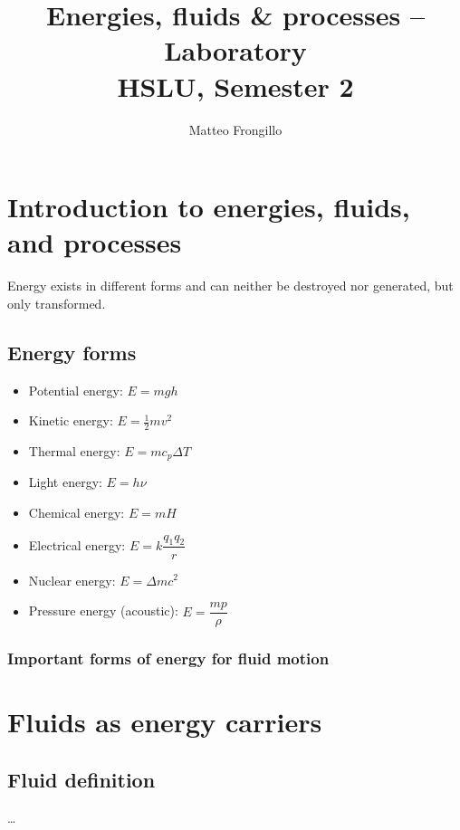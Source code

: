 \documentclass{article}
\title{\textbf{Energies, fluids \& processes -- Laboratory \\ HSLU, Semester 2}}
\author{Matteo Frongillo}
\date{}
\begin{document}
\maketitle
\tableofcontents
\pagebreak

\section{Introduction to energies, fluids, and processes}
Energy exists in different forms and can neither be destroyed nor generated, but only
transformed.

\subsection{Energy forms}
\begin{minipage}{.45\textwidth}
    \begin{itemize}[itemsep=6pt]
        \item Potential energy: $E = mgh$
        \item Kinetic energy: $E = \frac{1}{2}mv^2$
        \item Thermal energy: $E = mc_p\Delta T$
        \item Light energy: $E = h\nu$
    \end{itemize}
\end{minipage}
\hfill
\begin{minipage}{.45\textwidth}
    \begin{itemize}[itemsep=6pt]
        \item Chemical energy: $E = mH$
        \item Electrical energy: $E = k\dfrac{q_1 q_2}{r}$
        \item Nuclear energy: $E = \Delta mc^2$
        \item Pressure energy (acoustic): $E = \dfrac{m p}{\rho}$
    \end{itemize}
\end{minipage}

\subsubsection{Important forms of energy for fluid motion}

\section{Fluids as energy carriers}
\subsection{Fluid definition}
\dots
\end{document}
